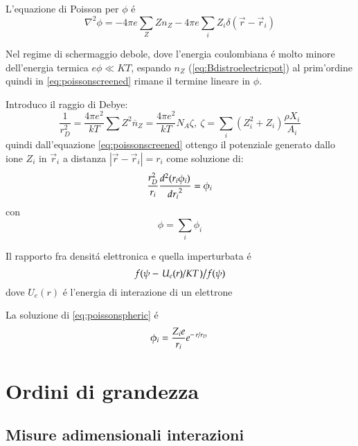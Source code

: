 \documentclass[main.tex]{subfiles}
\begin{document}
L'equazione di Poisson per $\phi$ \'e
\begin{equation}\label{eq:poissonscreened}
\nabla^2\phi=-4\pi e\sum_Z Zn_Z-4\pi e\sum_i Z_i\delta(\vec{r}-\vec{r}_i)
\end{equation}

Nel regime di schermaggio debole, dove l'energia coulombiana \'e molto minore dell'energia termica $e\phi\ll KT$, espando $n_Z$ (\eqref{eq:Bdistroelectricpot}) al prim'ordine quindi in \eqref{eq:poissonscreened} rimane il termine lineare in $\phi$.

Introduco il raggio di Debye:
\begin{equation}
\frac{1}{r_D^2}=\frac{4\pi e^2}{kT}\sum Z^2\overline{n}_Z=\frac{4\pi e^2}{kT}N_A\zeta,\ \zeta=\sum_{i}(Z_i^2+Z_i)\frac{\rho X_i}{A_i}\label{eq:debyeradius}
\end{equation}
quindi dall'equazione \eqref{eq:poissonscreened} ottengo il potenziale generato dallo ione $Z_i$ in $\vec{r}_i$ a distanza $|\vec{r}-\vec{r}_i|=r_i$ come soluzione di:
\begin{equation}\label{eq:poissonspheric}
\frac{r_D^2}{r_i}\TtwoDy{r_i}{(r_i\phi_i)}=\phi_i
\end{equation}
con
\begin{equation}
\phi=\sum_i\phi_i
\end{equation}

\begin{workout}
Il rapporto fra densit\'a elettronica e quella imperturbata \'e
\begin{equation}
\midfrac{f(\psi-\midfrac{U_e(r)}{KT})}{f(\psi)}
\end{equation}
dove $U_e(r)$ \'e l'energia di interazione di un elettrone
\end{workout}

La soluzione di \eqref{eq:poissonspheric} \'e
\begin{equation}\label{eq:screenedpotential}
\phi_i=\frac{Z_ie}{r_i}\exp{-\midfrac{r}{r_D}}
\end{equation}

\section{Ordini di grandezza}

\subsection{Misure adimensionali interazioni}
\end{document}
